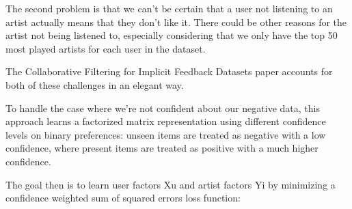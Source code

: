 \documentclass[12pt]{article}
\begin{document}
The second problem is that we can't be certain that a user not listening to an artist actually means that they don't like it. There could be other reasons for the artist not being listened to, especially considering that we only have the top 50 most played artists for each user in the dataset.

The Collaborative Filtering for Implicit Feedback Datasets paper accounts for both of these challenges in an elegant way.

To handle the case where we're not confident about our negative data, this approach learns a factorized matrix representation using different confidence levels on binary preferences: unseen items are treated as negative with a low confidence, where present items are treated as positive with a much higher confidence.

The goal then is to learn user factors Xu and artist factors Yi by minimizing a confidence weighted sum of squared errors loss function:



\end{document}

